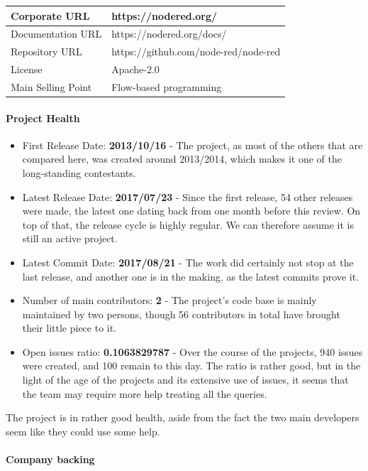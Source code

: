 \documentclass{article}
\begin{document}
\begin{center}
\begin{tabular}{|l|l|}
\hline
Corporate URL & https://nodered.org/ \\ \hline
Documentation URL & https://nodered.org/docs/ \\ \hline
Repository URL & https://github.com/node-red/node-red \\ \hline
License & Apache-2.0 \\ \hline
Main Selling Point & Flow-based programming \\ \hline
\end{tabular}
\end{center}

\paragraph{Project Health}

\begin{itemize}
\item First Release Date: \textbf{2013/10/16} - The project, as most of the others that are compared here, was created around 2013/2014, which makes it one of the long-standing contestants.
\item Latest Release Date: \textbf{2017/07/23} - Since the first release, 54 other releases were made, the latest one dating back from one month before this review. On top of that, the release cycle is highly regular. We can therefore assume it is still an active project.
\item Latest Commit Date: \textbf{2017/08/21} - The work did certainly not stop at the last release, and another one is in the making, as the latest commits prove it.
\item Number of main contributors: \textbf{2} - The project's code base is mainly maintained by two persons, though 56 contributors in total have brought their little piece to it.
\item Open issues ratio: \textbf{0.1063829787} - Over the course of the projects, 940 issues were created, and 100 remain to this day. The ratio is rather good, but in the light of the age of the projects and its extensive use of issues, it seems that the team may require more help treating all the queries.
\end{itemize}

The project is in rather good health, aside from the fact the two main developers seem like they could use some help.

\paragraph{Company backing}
\end{document}
